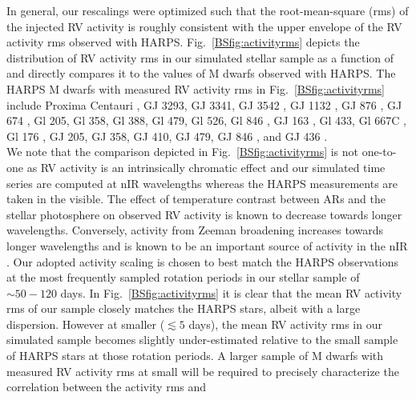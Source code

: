 In general, our rescalings were optimized such that the root-mean-square (rms) of the injected RV activity is
roughly consistent with the upper envelope of the RV activity rms observed with HARPS.
Fig.~\ref{BSfig:activityrms} depicts the distribution of RV activity rms in our simulated stellar
sample as a function of \prot{} and directly compares it to the values of M dwarfs observed with HARPS.
The HARPS M dwarfs with measured RV activity rms in Fig.~\ref{BSfig:activityrms} include
Proxima Centauri \citep{angladaescude16},
GJ 3293, GJ 3341, GJ 3542 \citep{astudillodefru15},
GJ 1132 \citep{berta15}, 
GJ 876 \citep{correia10},
GJ 674 \citep{bonfils07},
Gl 205, Gl 358, Gl 388, Gl 479, Gl 526, Gl 846 \citep{bonfils13},
GJ 163 \citep{bonfils13b},
Gl 433, Gl 667C \citep{delfosse13b},
Gl 176 \citep{forveille09},
GJ 205, GJ 358, GJ 410, GJ 479, GJ 846 \citep{hebrard16},
and GJ 436 \citep{lanotte14}.  \\

We note that the comparison depicted in Fig.~\ref{BSfig:activityrms}
is not one-to-one as RV activity is an intrinsically chromatic effect and our
simulated time series are computed at nIR wavelengths whereas the HARPS measurements are taken in the
visible. The effect of temperature contrast between ARs and the stellar photosphere on observed RV activity
is known to decrease towards longer wavelengths. Conversely, activity from Zeeman broadening increases towards
longer wavelengths and is known to be an important source of activity in the nIR \citep{hebrard14,moutou17}.
Our adopted activity scaling is chosen to best match the HARPS observations at the most frequently sampled rotation periods
in our stellar sample of $\sim 50-120$ days. In Fig.~\ref{BSfig:activityrms} it is clear that the mean RV activity rms
of our sample closely matches the HARPS stars, albeit with a large dispersion.
However at smaller \prot{} ($\lesssim 5$ days),
the mean RV activity rms in our simulated sample becomes slightly under-estimated relative to
the small sample of HARPS stars at those rotation periods. A larger sample of M dwarfs with measured RV activity rms at 
small \prot{} will be required to precisely characterize the correlation between the activity rms and

